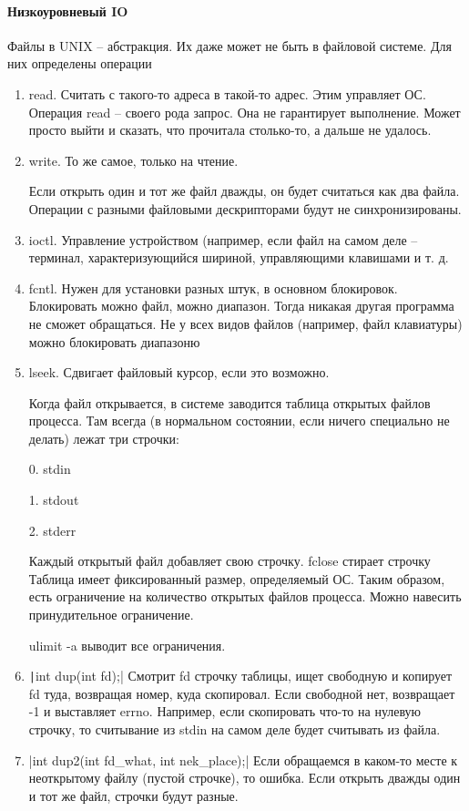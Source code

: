 \documentclass[a4paper,10pt]{article}
\newcommand{\ci}{\texttt}
\newcommand{\cl}{\mint{c}}
\begin{document}
\paragraph{Низкоуровневый IO}
Файлы в UNIX -- абстракция. Их даже может не быть в файловой системе. Для них определены операции 
\begin{enumerate}
\item read. Считать с такого-то адреса в такой-то адрес. Этим управляет ОС. Операция read -- своего рода запрос. Она не гарантирует выполнение. Может просто выйти и сказать, что прочитала столько-то, а дальше не удалось.
\item write. То же самое, только на чтение.

Если открыть один и тот же файл дважды, он будет считаться как два файла. Операции с разными файловыми дескрипторами будут не синхронизированы. 
\item ioctl. Управление устройством (например, если файл на самом деле -- терминал, характеризующийся шириной, управляющими клавишами и т. д.
\item fcntl. Нужен для установки разных штук, в основном блокировок. Блокировать можно файл, можно диапазон. Тогда никакая другая программа не сможет обращаться. Не у всех видов файлов (например, файл клавиатуры) можно блокировать диапазоню
\item lseek. Сдвигает файловый курсор, если это возможно.

Когда файл открывается, в системе заводится таблица открытых файлов процесса. Там всегда (в нормальном состоянии, если ничего специально не делать) лежат три строчки:

0. stdin

1. stdout

2. stderr

Каждый открытый файл добавляет свою строчку. fclose стирает строчку
Таблица имеет фиксированный размер, определяемый ОС. Таким образом, есть ограничение на количество открытых файлов процесса. Можно навесить принудительное ограничение. 

ulimit -a выводит все ограничения.

\item \ci|int dup(int fd);| Смотрит fd строчку таблицы, ищет свободную и копирует fd туда, возвращая номер, куда скопировал. Если свободной нет, возвращает -1 и выставляет errno.
Например, если скопировать что-то на нулевую строчку, то считывание из stdin на самом деле будет считывать из файла.

\item \cl|int dup2(int fd_what, int nek_place);|
Если обращаемся в каком-то месте к неоткрытому файлу (пустой строчке), то ошибка. Если открыть дважды один и тот же файл, строчки будут разные.


\end{enumerate}
\end{document}
